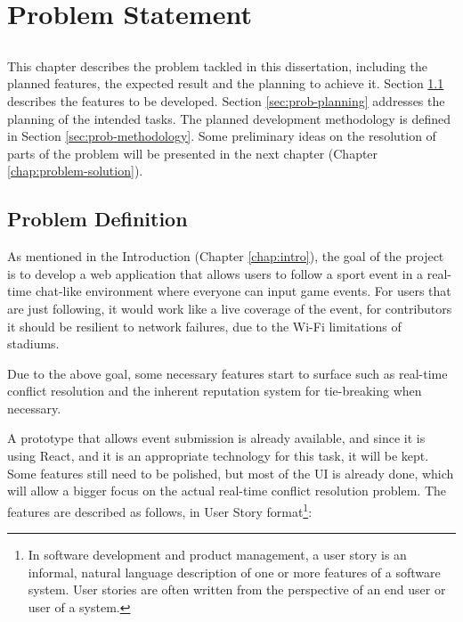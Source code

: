 \chapter{Problem Statement}\label{chap:problem}

\section*{}

This chapter describes the problem tackled in this dissertation, including the planned features, the expected result and the planning to achieve it. Section \ref{sec:prob-def} describes the features to be developed. Section \ref{sec:prob-planning} addresses the planning of the intended tasks. The planned development methodology is defined in Section \ref{sec:prob-methodology}. Some preliminary ideas on the resolution of parts of the problem will be presented in the next chapter (Chapter \ref{chap:problem-solution}). 

\section{Problem Definition}\label{sec:prob-def}

As mentioned in the Introduction (Chapter \ref{chap:intro}), the goal of the project is to develop a web application that allows users to follow a sport event in a real-time chat-like environment where everyone can input game events. For users that are just following, it would work like a live coverage of the event, for contributors it should be resilient to network failures, due to the Wi-Fi limitations of stadiums.

Due to the above goal, some necessary features start to surface such as real-time conflict resolution and the inherent reputation system for tie-breaking when necessary. 

A prototype that allows event submission is already available, and since it is using React, and it is an appropriate technology for this task, it will be kept. Some features still need to be polished, but most of the UI is already done, which will allow a bigger focus on the actual real-time conflict resolution problem. The features are described as follows, in User Story format\footnote{In software development and product management, a user story is an informal, natural language description of one or more features of a software system. User stories are often written from the perspective of an end user or user of a system.}:

